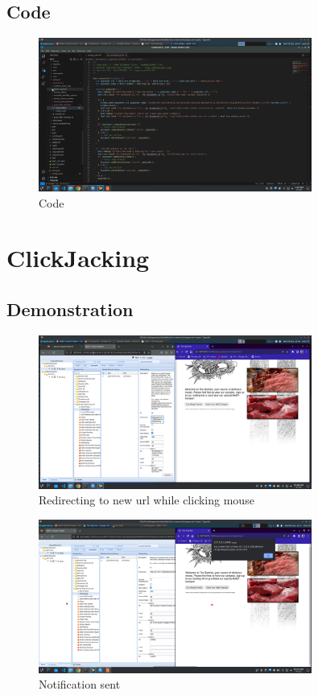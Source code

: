 \documentclass{report}
\begin{document}
\pagebreak

\subsection{Code}
\begin{figure}[!htbp]
    \centering
    \includegraphics[width=0.8\textwidth]{Create Pop Under/code.png}
    \caption{Code}
    \label{fig:cpu3}
\end{figure}

\pagebreak

\section{ClickJacking}
\subsection{Demonstration}

\begin{figure}[!htbp]
    \centering
    \includegraphics[width=0.8\textwidth]{ClickJacking/1.png}
    \caption{Redirecting to new url while clicking mouse}
    \label{fig:cj1}
\end{figure}

\begin{figure}[!htbp]
    \centering
    \includegraphics[width=0.8\textwidth]{ClickJacking/2.png}
    \caption{Notification sent}
    \label{fig:cj2}
\end{figure}
\end{document}
